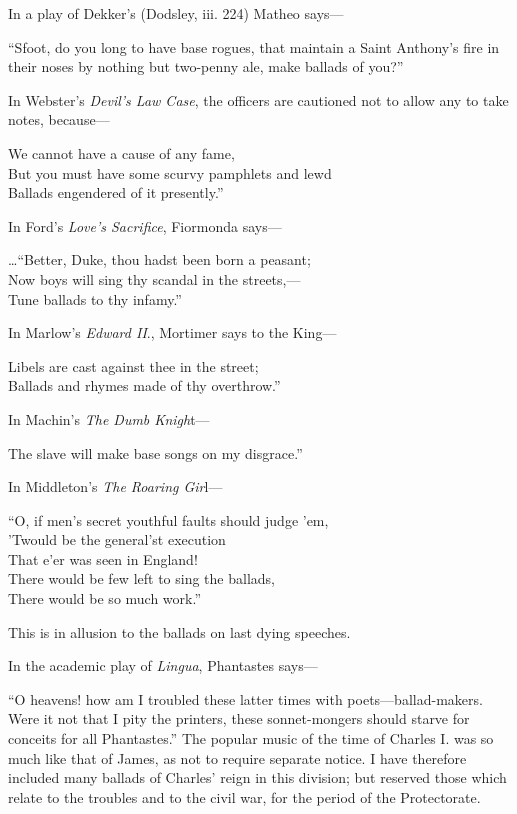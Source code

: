 In a play of Dekker’s (Dodsley, iii. 224) Matheo says—

“Sfoot, do you long to have base rogues, that maintain a Saint Anthony’s fire in
their noses by nothing but two-penny ale, make ballads of you?”

In Webster’s \textit{Devil's Law Case}, the officers are cautioned not to allow any to
take notes, because—
\begin{scverse}We cannot have a cause of any fame,\\
But you must have some scurvy pamphlets and lewd\\
Ballads engendered of it presently.”
\end{scverse}

In Ford’s \textit{Love's Sacrifice}, Fiormonda says—
\begin{scverse}\dots “Better, Duke, thou hadst been born a peasant;\\
Now boys will sing thy scandal in the streets,—\\
Tune ballads to thy infamy.”
\end{scverse}

In Marlow’s \textit{Edward II}., Mortimer says to the King—
\begin{scverse}Libels are cast against thee in the street;\\
Ballads and rhymes made of thy overthrow.”
\end{scverse}

In Machin’s \textit{The Dumb Knigh}t—
\begin{scverse}The slave will make base songs on my disgrace.”
\end{scverse}

In Middleton’s \textit{The Roaring Gir}l—
\begin{scverse}“O, if men’s secret youthful faults should judge ’em,\\
’Twould be the general’st execution\\
That e’er was seen in England!\\
There would be few left to sing the ballads,\\
There would be so much work.”
\end{scverse}

This is in allusion to the ballads on last dying speeches.
\pagebreak

In the academic play of \textit{Lingua}, Phantastes says—

“O heavens! how am I troubled these latter times with poets—ballad-makers. Were
it not that I pity the printers, these sonnet-mongers should starve for conceits for all
Phantastes.”
\centerrule
The popular music of the time of Charles I. was so much like that of James,
as not to require separate notice. I have therefore included many ballads
of Charles’ reign in this division; but reserved those which relate to the troubles
and to the civil war, for the period of the Protectorate.
\centerrule
{}

